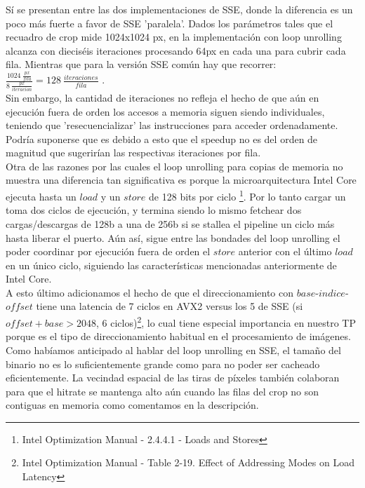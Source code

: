 Sí se presentan entre las dos implementaciones de SSE, donde la diferencia es un poco más fuerte a favor de SSE 'paralela'. Dados los parámetros tales que el recuadro de crop mide 1024x1024 px, en la implementación con loop unrolling alcanza con dieciséis iteraciones procesando 64px en cada una para cubrir cada fila. Mientras que para la versión SSE común hay que recorrer: $\frac{1024 \ \frac{px}{fila}}{8 \ \frac{px}{iteracion}} = 128 \ \frac{iteraciones}{fila}$ .
\\
Sin embargo, la cantidad de iteraciones no refleja el hecho de que aún en ejecución fuera de orden los accesos a memoria siguen siendo individuales, teniendo que 'resecuencializar' las instrucciones para acceder ordenadamente. Podría suponerse que es debido a esto que el speedup no es del orden de magnitud que sugerirían las respectivas iteraciones por fila.
\\
Otra de las razones por las cuales el loop unrolling para copias de memoria no muestra una diferencia tan significativa es porque la microarquitectura Intel Core ejecuta hasta un $load$ y un $store$ de 128 bits por ciclo \footnote{Intel Optimization Manual - 2.4.4.1 - Loads and Stores}. Por lo tanto cargar un \ymm{} toma dos ciclos de ejecución, y termina siendo lo mismo fetchear dos cargas/descargas de 128b a una de 256b si se stallea el pipeline un ciclo más hasta liberar el puerto. Aún así, sigue entre las bondades del loop unrolling el poder coordinar por ejecución fuera de orden el $store$ anterior con el último $load$ en un único ciclo, siguiendo las características mencionadas anteriormente de Intel Core.
\\
A esto último adicionamos el hecho de que el direccionamiento con $base$-$indice$-$offset$ tiene una latencia de 7 ciclos en AVX2 versus los 5 de SSE (si $offset+base > 2048$, 6 ciclos)\footnote{Intel Optimization Manual - Table 2-19. Effect of Addressing Modes on Load Latency}, lo cual tiene especial importancia en nuestro TP porque es el tipo de direccionamiento habitual en el procesamiento de imágenes.
\\

Como habíamos anticipado al hablar del loop unrolling en SSE, el tamaño del binario no es lo suficientemente grande como para no poder ser cacheado eficientemente. La vecindad espacial de las tiras de píxeles también colaboran para que el hitrate se mantenga alto aún cuando las filas del crop no son contiguas en memoria como comentamos en la descripción.
\\

